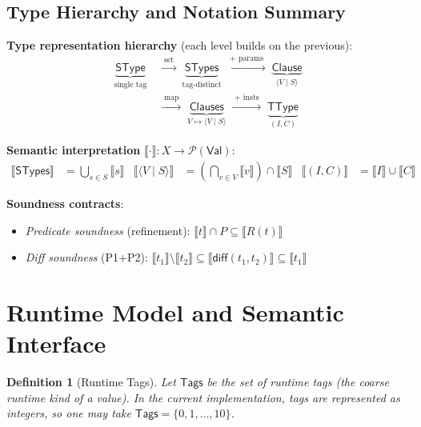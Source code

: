 \documentclass[11pt]{article}
\newtheorem{definition}[theorem]{Definition}
\newcommand{\sem}[1]{\llbracket #1 \rrbracket}
\newcommand{\diff}{\mathsf{diff}}
\newcommand{\SType}{\mathsf{SType}}
\newcommand{\Tags}{\mathsf{Tags}}
\newcommand{\TType}{\mathsf{TType}}
\newcommand{\Clauses}{\mathsf{Clauses}}
\newcommand{\Clause}{\mathsf{Clause}}
\newcommand{\STypes}{\mathsf{STypes}}
\newcommand{\Val}{\mathsf{Val}}
\newcommand{\clause}[2]{\langle #1 \mid #2 \rangle}
\begin{document}
\subsection*{Type Hierarchy and Notation Summary}

\begin{keydef}
\textbf{Type representation hierarchy} (each level builds on the previous):
\begin{align*}
\underbrace{\SType}_{\text{single tag}}
&\;\xrightarrow{\;\text{set}\;}\;
\underbrace{\STypes}_{\text{tag-distinct}}
\;\xrightarrow{\;\text{+ params}\;}\;
\underbrace{\Clause}_{\clause{V}{S}} \\
&\;\xrightarrow{\;\text{map}\;}\;
\underbrace{\Clauses}_{V \mapsto \clause{V}{S}}
\;\xrightarrow{\;\text{+ insts}\;}\;
\underbrace{\TType}_{(I, C)}
\end{align*}

\medskip
\textbf{Semantic interpretation} $\sem{\cdot} : X \to \mathcal{P}(\Val)$:
\begin{align*}
\sem{\STypes} &= \textstyle\bigcup_{s \in S} \sem{s}
&\sem{\clause{V}{S}} &= \textstyle\left(\bigcap_{v \in V} \sem{v}\right) \cap \sem{S}
&\sem{(I,C)} &= \sem{I} \cup \sem{C}
\end{align*}

\medskip
\textbf{Soundness contracts}:
\begin{itemize}
\item \emph{Predicate soundness} (refinement): $\sem{t} \cap P \subseteq \sem{R(t)}$
\item \emph{Diff soundness} (P1+P2): $\sem{t_1}\setminus\sem{t_2} \subseteq \sem{\diff(t_1,t_2)} \subseteq \sem{t_1}$
\end{itemize}
\end{keydef}

\section{Runtime Model and Semantic Interface}

\begin{definition}[Runtime Tags]
\label{def:runtime-tags}
Let $\Tags$ be the set of runtime tags (the coarse runtime kind of a value). In the current implementation, tags are represented as integers, so one may take $\Tags = \{0,1,\ldots,10\}$.
\end{definition}
\end{document}
